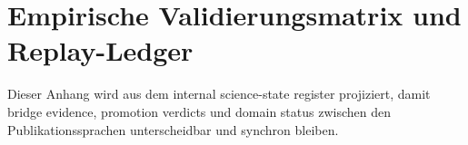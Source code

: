 \section{Empirische Validierungsmatrix und Replay-Ledger}
\label{sec:oc-core-1-3-empirical-validation-matrix-de}
\label{sec:oc-core-1-3-empirical-validation-matrix}

Dieser Anhang wird aus dem internal science-state register projiziert, damit bridge
evidence, promotion verdicts und domain status zwischen den
Publikationssprachen unterscheidbar und synchron bleiben.

\begingroup
\footnotesize
\RaggedRight
\sloppy
\setlength{\tabcolsep}{2pt}
\setlength{\LTleft}{0pt}
\setlength{\LTright}{0pt}

\endgroup
